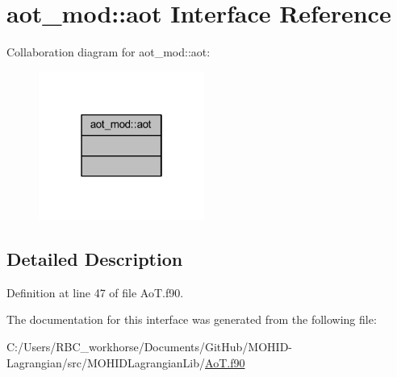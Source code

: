 \hypertarget{interfaceaot__mod_1_1aot}{}\section{aot\+\_\+mod\+:\+:aot Interface Reference}
\label{interfaceaot__mod_1_1aot}


Collaboration diagram for aot\+\_\+mod\+:\+:aot\+:\nopagebreak
\begin{figure}[H]
\begin{center}
\leavevmode
\includegraphics[width=154pt]{interfaceaot__mod_1_1aot__coll__graph}
\end{center}
\end{figure}


\subsection{Detailed Description}


Definition at line 47 of file Ao\+T.\+f90.



The documentation for this interface was generated from the following file\+:\begin{DoxyCompactItemize}
\item 
C\+:/\+Users/\+R\+B\+C\+\_\+workhorse/\+Documents/\+Git\+Hub/\+M\+O\+H\+I\+D-\/\+Lagrangian/src/\+M\+O\+H\+I\+D\+Lagrangian\+Lib/\mbox{\hyperlink{_ao_t_8f90}{Ao\+T.\+f90}}\end{DoxyCompactItemize}
